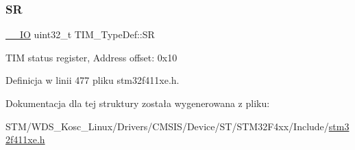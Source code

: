 \subsubsection{\texorpdfstring{SR}{SR}}
{\footnotesize\ttfamily \hyperlink{core__sc300_8h_aec43007d9998a0a0e01faede4133d6be}{\+\_\+\+\_\+\+IO} uint32\+\_\+t T\+I\+M\+\_\+\+Type\+Def\+::\+SR}

T\+IM status register, Address offset\+: 0x10 

Definicja w linii 477 pliku stm32f411xe.\+h.



Dokumentacja dla tej struktury została wygenerowana z pliku\+:\begin{DoxyCompactItemize}
\item 
S\+T\+M/\+W\+D\+S\+\_\+\+Kosc\+\_\+\+Linux/\+Drivers/\+C\+M\+S\+I\+S/\+Device/\+S\+T/\+S\+T\+M32\+F4xx/\+Include/\hyperlink{stm32f411xe_8h}{stm32f411xe.\+h}\end{DoxyCompactItemize}
